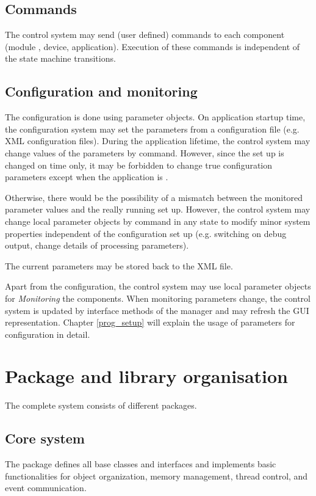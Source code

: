\subsection{Commands}
The control system may send (user defined) commands to each 
   component (module , device, application). Execution of these commands is 
   independent of the state machine transitions.

\subsection{Configuration and monitoring}
The configuration is done using parameter objects.
On application startup time, the configuration system may 
set the parameters from a configuration file (e.g. XML configuration files). 
During the application lifetime, the control system may change 
values of the parameters by command. However, since the set 
up is changed on  time only, it may be forbidden to change 
true configuration parameters except when the application is . 

Otherwise, there would be the possibility of a mismatch between the 
monitored parameter values and the really running set up.
However, the control system may change local parameter objects 
by command in any state to modify minor system properties 
independent of the configuration set up (e.g. switching on 
debug output, change details of processing parameters).
      
The current parameters  may be stored back to the XML file.

      
Apart from the configuration, 
the control system may use local parameter objects for 
{\sl Monitoring} the components. When monitoring parameters change, 
the control system is updated by interface methods of the 
manager and may refresh the GUI representation.
Chapter \ref{prog_setup} will explain the usage of parameters for configuration
in detail. 


\section{Package and library organisation}
The complete system consists of different packages. 




\subsection{Core system}
The  package defines all base classes and interfaces
and implements basic functionalities for object organization, memory management, 
thread control, and event communication. 
   
